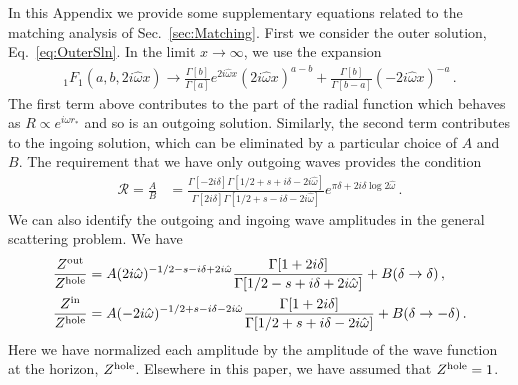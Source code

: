 \begin{refsection}
In this Appendix we provide some supplementary equations related to the matching analysis of Sec.~\ref{sec:Matching}.
First we consider the outer solution, Eq.~\eqref{eq:OuterSln}.
In the limit $x \to \infty$, we use the expansion~\cite{nist}
\begin{align}
{}_1 F_1(a, b, 2 i \hat \omega x) \to \frac{\Gamma[b]}{\Gamma[a]} e^{2 i \hat \omega x}(2 i \hat \omega x)^{a-b} + \frac{\Gamma[b]}{\Gamma[b -a ]} (-2 i \hat \omega x)^{-a} \,. 
\end{align}
The first term above contributes to the part of the radial function which behaves as $R \propto e^{i \omega r_*}$ and so is an outgoing solution. Similarly, the second term contributes to the ingoing solution, which can be eliminated by a particular choice of $A$ and $B$.
The requirement that we have only outgoing waves provides the condition
\begin{align}
\label{eq:Ratio1}
\mathcal R = \frac{A}{B} & = \frac{\Gamma[-2 i \delta] \Gamma[1/2 + s + i \delta - 2 i \hat \omega]}{\Gamma[2  i \delta] \Gamma[1/2 + s - i \delta - 2 i \hat \omega]} e^{\pi \delta+ 2 i \delta \log 2 \hat \omega} \,.
\end{align}
We can also identify the outgoing and ingoing wave amplitudes in the general scattering problem. We have
\begin{align}
\label{eq:OuterAmp1}
\frac{Z^{\rm out}}{Z^{\rm hole}} & = A (2 i \hat \omega)^{-1/2 -s - i \delta + 2 i \hat \omega} \frac{\Gamma[1 + 2 i \delta]}{\Gamma[1/2 - s + i \delta + 2 i \hat \omega]} +B (\delta \to \delta) \,, \\
\label{eq:OuterAmp2}
\frac{Z^{\rm in}}{Z^{\rm hole}} & = A (-2 i \hat \omega)^{-1/2 + s - i \delta - 2 i \hat \omega} \frac{\Gamma[1 + 2 i \delta]}{\Gamma[1/2 + s + i \delta - 2 i \hat \omega]} + B (\delta \to - \delta)\,.
\end{align}
Here we have normalized each amplitude by the amplitude of the wave function at the horizon, $Z^{\rm hole}$. Elsewhere in this paper, we have assumed that $Z^{\rm hole} = 1$.


\end{refsection}
